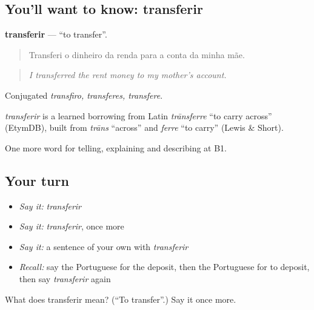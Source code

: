 \subsection*{You'll want to know: transferir}
\textbf{transferir} — \textquotedblleft{}to transfer\textquotedblright{}.

\begin{quote}
Transferi o dinheiro da renda para a conta da minha mãe.
\end{quote}

\begin{quote}
\emph{I transferred the rent money to my mother's account.}
\end{quote}

Conjugated \emph{transfiro, transferes, transfere}.

\begin{cousinweb}
\emph{transferir} is a learned borrowing from Latin \emph{trānsferre} \textquotedblleft{}to carry across\textquotedblright{} (EtymDB), built from \emph{trāns} \textquotedblleft{}across\textquotedblright{} and \emph{ferre} \textquotedblleft{}to carry\textquotedblright{} (Lewis \& Short).
\end{cousinweb}

\begin{grammarlens}[title={What you've built}]
One more word for telling, explaining and describing at B1.
\end{grammarlens}

\subsection*{Your turn}
\begin{itemize}
\raggedright
  \item \emph{Say it:} \emph{transferir}
  \item \emph{Say it:} \emph{transferir}, once more
  \item \emph{Say it:} a sentence of your own with \emph{transferir}
  \item \emph{Recall:} say the Portuguese for the deposit, then the Portuguese for to deposit, then say \emph{transferir} again
\end{itemize}

\begin{tcolorbox}[breakable,colback=teal!4,colframe=teal!35!black,title={Before you move on}]
What does transferir mean? (\textquotedblleft{}To transfer\textquotedblright{}.) Say it once more.
\end{tcolorbox}
